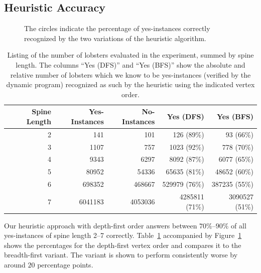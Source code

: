 \subsection{Heuristic Accuracy}

\begin{figure}
    \centering %
    \scalebox{.8}{}
    \caption[Heuristic accuracy]{The circles indicate the percentage of yes-instances correctly recognized by the two variations of the heuristic algorithm.}
    \label{fig:ch5_accuracy}
\end{figure}

\begin{table}
\centering
\begin{tabular}{ r|r|r|r|r }
\toprule
Spine Length & Yes-Instances & No-Instances & Yes (DFS) & Yes (BFS) \\
\hline
2	& 141	& 101			& 126	  (89\%) & 93      (66\%) \\
3	& 1107	& 757			& 1023	  (92\%) & 778     (70\%) \\
4	& 9343	& 6297			& 8092	  (87\%) & 6077    (65\%) \\
5	& 80952	& 54336			& 65635	  (81\%) & 48652   (60\%) \\
6	& 698352	& 468667	& 529979  (76\%) & 387235  (55\%) \\
7	& 6041183	& 4053036	& 4285811 (71\%) & 3090527 (51\%) \\
\bottomrule
\end{tabular}
\caption[Heuristic accuracy]{Listing of the number of lobsters evaluated in the experiment, summed by spine length. The columns ``Yes (DFS)'' and ``Yes (BFS)'' show the absolute and relative number of lobsters which we know to be yes-instances (verified by the dynamic program) recognized as such by the heuristic using the indicated vertex order.}
\label{tbl:heuristic-accuracy}
\end{table}

Our heuristic approach with depth-first order answers between $70\%$--$90\%$ of all yes-instances of spine length 2--7 correctly. Table~\ref{tbl:heuristic-accuracy} accompanied by Figure~\ref{fig:ch5_accuracy} shows the percentages for the depth-first vertex order and compares it to the breadth-first variant. The variant is shown to perform consistently worse by around $20$ percentage points.
